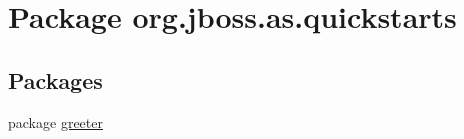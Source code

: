 \hypertarget{namespaceorg_1_1jboss_1_1as_1_1quickstarts}{}\section{Package org.\+jboss.\+as.\+quickstarts}
\label{namespaceorg_1_1jboss_1_1as_1_1quickstarts}
\subsection*{Packages}
\begin{DoxyCompactItemize}
\item 
package \hyperlink{namespaceorg_1_1jboss_1_1as_1_1quickstarts_1_1greeter}{greeter}
\end{DoxyCompactItemize}
